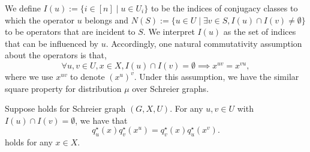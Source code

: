 We define $I(u) := \{i\in [n]\mid u\in U_i\}$ to be the indices of conjugacy classes to which the operator $u$ belongs and $N(S) :=  \{u\in U\mid \exists v\in S, I(u)\cap I(v) \neq \emptyset\}$ to be operators that are incident to $S$.
We interpret $I(u)$ as the set of indices that can be influenced by $u$.
Accordingly, one natural commutativity assumption about the operators is that,
\begin{equation}\label{eq:commutativity_assumption_CSGE}
    \forall u,v\in U, x\in X, I(u)\cap I(v) = \emptyset \implies x^{uv} = x^{vu},
\end{equation}
where we use $x^{uv}$ to denote $(x^u)^v$.
Under this assumption, we have the similar square property for distribution $\mu$ over Schreier graphs.
\begin{fact}\label{fact:square_property_SGraph}
    Suppose  holds for Schreier graph $(G,X,U)$.
    For any $u,v\in U$ with $I(u)\cap I(v) = \emptyset$, we have that
    $$
        q_u^\star(x)q_v^\star(x^u) = q_v^\star(x)q_u^\star(x^v).
    $$
    holds for any $x\in X$.
\end{fact}


